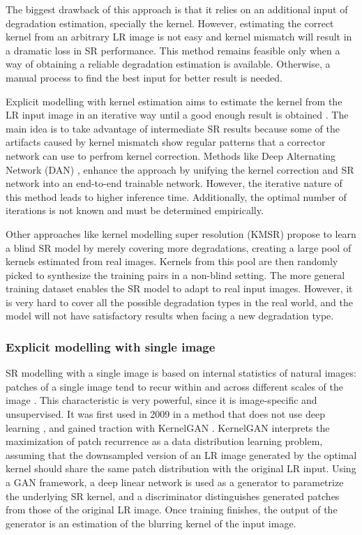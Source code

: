         The biggest drawback  of this approach is that it relies on an additional input of degradation estimation, specially the kernel. 
        However, estimating the correct kernel from an arbitrary LR image is not easy and kernel mismatch will result in a dramatic loss in SR performance.
        This method remains feasible only when a way of obtaining a reliable degradation estimation is available.
        Otherwise, a manual process to find the best input for better result is needed.
        
        Explicit modelling with kernel estimation aims to estimate the kernel from the LR input image in an iterative way until a good enough result is obtained \cite{gu2019blind}.
        The main idea is to take advantage of intermediate SR results because some of the artifacts caused by kernel mismatch show regular patterns that a corrector network can use to perfrom kernel correction.
        Methods like Deep Alternating Network (DAN) \cite{luo2020unfolding}, enhance the approach by unifying the kernel correction and SR network into an end-to-end trainable network. 
        However, the iterative nature of this method leads to higher inference time. Additionally, the optimal number of iterations is not known and must be determined empirically.

        Other approaches like kernel modelling super resolution (KMSR) \cite{zhou19}  propose to learn a blind SR model by merely covering more degradations, creating a large pool of kernels estimated from real images.
        Kernels from this pool are then randomly picked to synthesize the training pairs in a non-blind setting. 
        The more general training dataset enables the SR model to adapt to real input images. 
        However, it is very hard to cover all the possible degradation types in the real world, and the model will not have satisfactory results when facing a new degradation type.


        \subsubsection{Explicit modelling with single image}

        SR modelling with a single image is based on internal statistics of natural images: patches of a single image tend to recur within and across different scales of the image \cite{zontak2011}.
        This characteristic is very powerful, since it is image-specific and unsupervised. It was first used in 2009 in a method that does not use deep learning \cite{glasner2009}, and gained traction with KernelGAN \cite{bellkligler2020blind}. 
        KernelGAN interprets the maximization of patch recurrence as a data distribution learning problem, assuming that the downsampled version of an LR image generated by the optimal kernel should share the same patch distribution with the original LR input.
        Using a GAN framework, a deep linear network is used as a generator to parametrize the underlying SR kernel, and a discriminator distinguishes generated patches from those of the original LR image.
        Once training finishes, the output of the generator is an estimation of the blurring kernel of the input image. 

